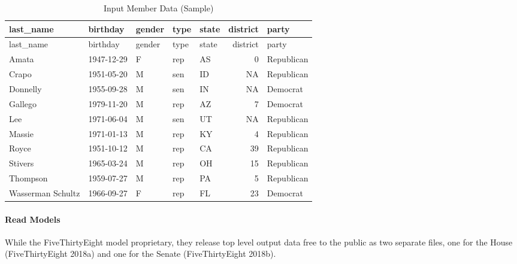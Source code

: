 \documentclass[]{article}
\newenvironment{Shaded}{\begin{snugshade}}{\end{snugshade}}
\newcommand{\CommentTok}[1]{\textcolor[rgb]{0.56,0.35,0.01}{\textit{#1}}}
\newcommand{\DataTypeTok}[1]{\textcolor[rgb]{0.13,0.29,0.53}{#1}}
\newcommand{\KeywordTok}[1]{\textcolor[rgb]{0.13,0.29,0.53}{\textbf{#1}}}
\newcommand{\NormalTok}[1]{#1}
\newcommand{\OperatorTok}[1]{\textcolor[rgb]{0.81,0.36,0.00}{\textbf{#1}}}
\newcommand{\StringTok}[1]{\textcolor[rgb]{0.31,0.60,0.02}{#1}}
\let\oldparagraph\paragraph
\renewcommand{\paragraph}[1]{\oldparagraph{#1}\mbox{}}
\begin{document}
\begin{longtable}[]{@{}lllllrl@{}}
\caption{Input Member Data (Sample)}\tabularnewline
\toprule
last\_name & birthday & gender & type & state & district &
party\tabularnewline
\midrule
\endfirsthead
\toprule
last\_name & birthday & gender & type & state & district &
party\tabularnewline
\midrule
\endhead
Amata & 1947-12-29 & F & rep & AS & 0 & Republican\tabularnewline
Crapo & 1951-05-20 & M & sen & ID & NA & Republican\tabularnewline
Donnelly & 1955-09-28 & M & sen & IN & NA & Democrat\tabularnewline
Gallego & 1979-11-20 & M & rep & AZ & 7 & Democrat\tabularnewline
Lee & 1971-06-04 & M & sen & UT & NA & Republican\tabularnewline
Massie & 1971-01-13 & M & rep & KY & 4 & Republican\tabularnewline
Royce & 1951-10-12 & M & rep & CA & 39 & Republican\tabularnewline
Stivers & 1965-03-24 & M & rep & OH & 15 & Republican\tabularnewline
Thompson & 1959-07-27 & M & rep & PA & 5 & Republican\tabularnewline
Wasserman Schultz & 1966-09-27 & F & rep & FL & 23 &
Democrat\tabularnewline
\bottomrule
\end{longtable}

\hypertarget{read-models}{%
\paragraph{Read Models}\label{read-models}}

While the FiveThirtyEight model proprietary, they release top level
output data free to the public as two separate files, one for the House
(FiveThirtyEight 2018a) and one for the Senate (FiveThirtyEight 2018b).

\begin{Shaded}
\end{Shaded}
\end{document}
